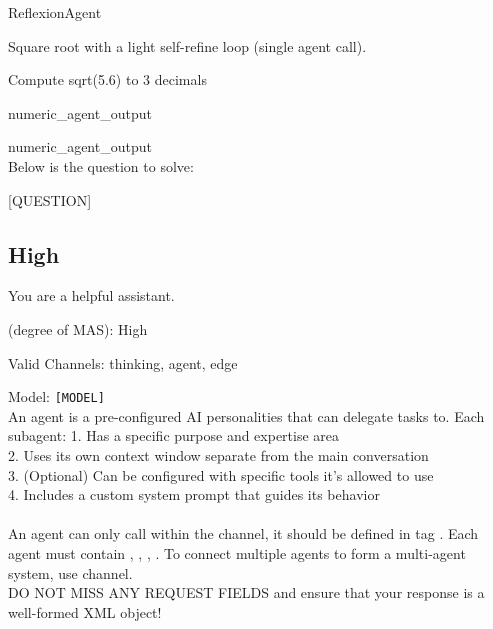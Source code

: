 \begin{userprompt}[title={User Prompt}]
\quad{}ReflexionAgent

\quad{}
Square root with a light self-refine loop (single agent call).

\quad{}

\qquad{}Compute sqrt(5.6) to 3 decimals

\quad{}

\quad{}numeric_agent_output


numeric_agent_output \\


Below is the question to solve: 

[QUESTION]


\end{userprompt}


\subsection{High \masness}



\begin{systemprompt}[title={System Prompt}]
You are a helpful assistant.

\masness (degree of MAS): High

Valid Channels: thinking, agent, edge

Model: \texttt{[MODEL]}\\

An agent is a pre-configured AI personalities that can delegate tasks to. Each subagent:
1. Has a specific purpose and expertise area\\
2. Uses its own context window separate from the main conversation\\
3. (Optional) Can be configured with specific tools it's allowed to use\\
4. Includes a custom system prompt that guides its behavior\\
\\
An agent can only call within the  channel, it should be defined in tag . Each agent must contain , , , . To connect multiple agents to form a multi-agent system, use  channel.\\


DO NOT MISS ANY REQUEST FIELDS and ensure that your response is a well-formed XML object!
\end{systemprompt}


